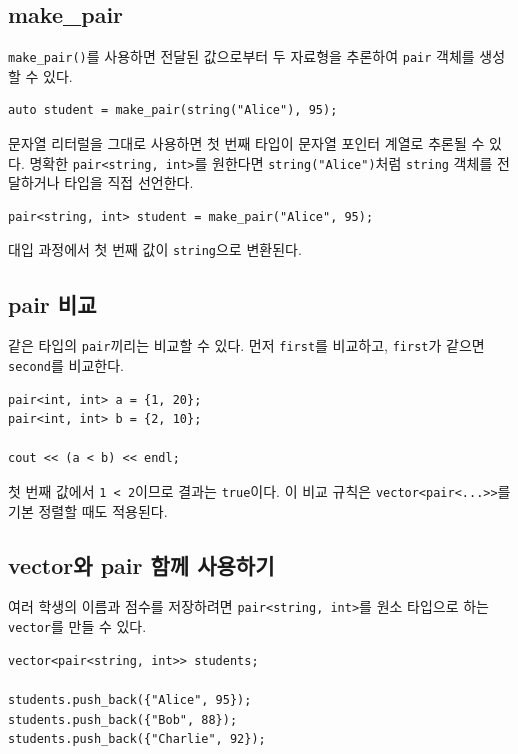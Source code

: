 \documentclass[11pt,a4paper]{article}
\begin{document}
\subsection{make\_pair}
\texttt{make\_pair()}를 사용하면 전달된 값으로부터 두 자료형을 추론하여 \texttt{pair} 객체를 생성할 수 있다.

\begin{lstlisting}
auto student = make_pair(string("Alice"), 95);
\end{lstlisting}

문자열 리터럴을 그대로 사용하면 첫 번째 타입이 문자열 포인터 계열로 추론될 수 있다. 명확한 \texttt{pair<string, int>}를 원한다면 \texttt{string("Alice")}처럼 \texttt{string} 객체를 전달하거나 타입을 직접 선언한다.

\begin{lstlisting}
pair<string, int> student = make_pair("Alice", 95);
\end{lstlisting}

대입 과정에서 첫 번째 값이 \texttt{string}으로 변환된다.

\subsection{pair 비교}
같은 타입의 \texttt{pair}끼리는 비교할 수 있다. 먼저 \texttt{first}를 비교하고, \texttt{first}가 같으면 \texttt{second}를 비교한다.

\begin{lstlisting}
pair<int, int> a = {1, 20};
pair<int, int> b = {2, 10};

cout << (a < b) << endl;
\end{lstlisting}

첫 번째 값에서 \texttt{1 < 2}이므로 결과는 \texttt{true}이다. 이 비교 규칙은 \texttt{vector<pair<...>>}를 기본 정렬할 때도 적용된다.

\subsection{vector와 pair 함께 사용하기}
여러 학생의 이름과 점수를 저장하려면 \texttt{pair<string, int>}를 원소 타입으로 하는 \texttt{vector}를 만들 수 있다.

\begin{lstlisting}
vector<pair<string, int>> students;

students.push_back({"Alice", 95});
students.push_back({"Bob", 88});
students.push_back({"Charlie", 92});
\end{lstlisting}
\end{document}
